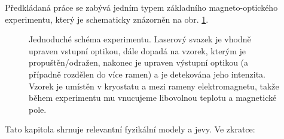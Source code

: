 Předkládaná práce se zabývá jedním typem základního magneto-optického experimentu, který je schematicky znázorněn na obr. \ref{fig:zakladni-schema}.

\begin{figure}[htbp]
    \centering
    \caption{Jednoduché schéma experimentu. 
    Laserový svazek je vhodně upraven vstupní optikou, dále dopadá na vzorek, kterým je propuštěn/odražen, nakonec je upraven výstupní optikou (a případně rozdělen do více ramen) a je detekována jeho intenzita. 
    Vzorek je umístěn v kryostatu a mezi rameny elektromagnetu, takže během experimentu mu vnucujeme libovolnou teplotu a magnetické pole.}
    \label{fig:zakladni-schema}
\end{figure}

Tato kapitola shrnuje relevantní fyzikální modely a jevy.
Ve zkratce:
